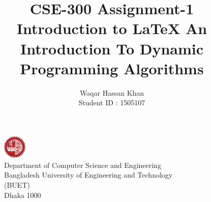 \documentclass[12pt]{article}
\title{
	\Large{CSE-300 Assignment-1}
	\endgraf
	\Large{Introduction to \LaTeX}
	\endgraf\bigskip	
	\textbf{An Introduction To Dynamic Programming Algorithms}
	\endgraf\bigskip
}
\author{
	\Large{Waqar Hassan Khan}\\
	\Large{Student ID : 1505107}
}
\date{}
\begin{document}
\maketitle

\section*{}
\begin{figure}[b]
	\centering
	
	\captionsetup{justification=centering}
	\includegraphics[width = 0.1\textwidth]{image/buet.png}
	\caption*{
		\Large{Department of Computer Science and Engineering}
		\\
		\Large{Bangladesh University of Engineering and Technology}
		\\
		\Large{(BUET)}
		\\
		\Large{Dhaka 1000}
	}
	
\end{figure}

	
	
\end{document}
